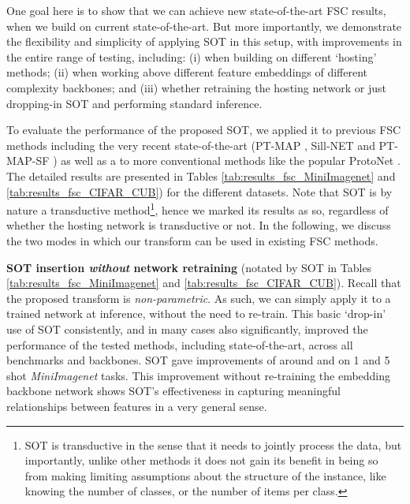 One goal here is to show that we can achieve new state-of-the-art FSC results, when we build on current state-of-the-art. But more importantly, we demonstrate the flexibility and simplicity of applying SOT in this setup, with improvements in the entire range of testing, including: (i) when building on different `hosting' methods; (ii) when working above different feature embeddings of different complexity backbones; and (iii) whether retraining the hosting network or just dropping-in SOT and performing standard inference.

To evaluate the performance of the proposed SOT, we applied it to previous FSC methods including the very recent state-of-the-art (PT-MAP \cite{hu2020leveraging}, Sill-NET \cite{zhang2021sill} and PT-MAP-SF \cite{chen2021few}) as well as a to more conventional methods like the popular ProtoNet \cite{snell2017prototypical}. The detailed results are presented in Tables \ref{tab:results_fsc_MiniImagenet} and \ref{tab:results_fsc_CIFAR_CUB}) for the different datasets. Note that SOT is by nature a transductive method\footnote{SOT is transductive in the sense that it needs to jointly process the data, but importantly, unlike other methods it does not gain its benefit in being so from making limiting assumptions about the structure of the instance, like knowing the number of classes, or the number of items per class.}, hence we marked its results as so, regardless of whether the hosting network is transductive or not. In the following, we discuss the two modes in which our transform can be used in existing FSC methods.





\vspace{3pt}\noindent\textbf{SOT insertion \textit{without} network retraining}
(notated by SOT in Tables \ref{tab:results_fsc_MiniImagenet} and \ref{tab:results_fsc_CIFAR_CUB}).
Recall that the proposed transform is \textit{non-parametric}. As such, we can simply apply it to a trained network at inference, without the need to re-train. This basic `drop-in' use of SOT consistently, and in many cases also significantly, improved the performance of the tested methods, including state-of-the-art, across all benchmarks and backbones. 
SOT gave improvements of around  and  on 1 and 5 shot \emph{MiniImagenet} tasks. 
This improvement without re-training the embedding backbone network shows SOT's effectiveness in capturing meaningful relationships between features in a very general sense. 



